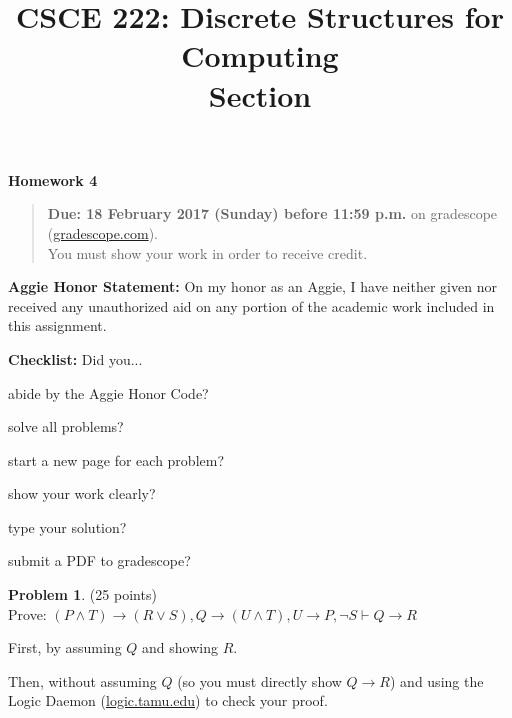 \documentclass{article}
\title{CSCE 222: Discrete Structures for Computing\\Section \mysectionnumber\\\mysemester}
\author{\myname}
\date{}
\theoremstyle{definition}
\newtheorem{problem}{Problem}
\newcommand{\honor}{\noindent \textbf{Aggie Honor Statement: }On my honor as an Aggie, I have neither
  given nor received any unauthorized aid on any portion of the academic work included in this assignment.
}
\newcommand{\checklist}{\noindent\textbf{Checklist:}
Did you...
\begin{compactenum}
\item abide by the Aggie Honor Code?
\item solve all problems?
\item start a new page for each problem?
\item show your work clearly?
\item type your solution?
\item submit a PDF to gradescope?
\end{compactenum}
}
\newcommand{\problemset}[1]{\begin{center}\textbf{Homework #1}\end{center}}
\newcommand{\duedate}[1]{\begin{quote}\textbf{Due: #1} on gradescope (\url{gradescope.com}). \\You must show your work in order to receive credit.\end{quote}}
\newcommand{\homeworknumber}[0]{4}
\begin{document}
\maketitle
\problemset{\homeworknumber}
\duedate{18 February 2017 (Sunday) before 11:59 p.m.}
\bigskip

\honor
\bigskip

\checklist

\begin{problem} (25 points)\\
Prove: $(P \wedge T) \to (R \vee S), Q \to (U \wedge T), U \to P, \neg S \vdash Q \to R$
\begin{compactenum}
\item First, by assuming $Q$ and showing $R$.
\item Then, without assuming $Q$ (so you must directly show $Q \to R$) and using the Logic Daemon (\url{logic.tamu.edu}) to check your proof.
\end{compactenum}
\end{problem}
\end{document}

